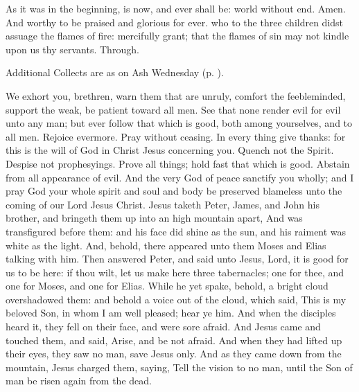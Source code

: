 As it was in the beginning, is now, and ever shall be: world without end. Amen. And worthy to be praised and glorious for ever.
{} who to the three children didst assuage the flames of fire: mercifully grant; that the flames of sin may not kindle upon us thy servants. Through.
\begin{rubric}
    Additional Collects are as on Ash Wednesday (p. \pageref{AshWednesdayMass}).
\end{rubric}
 We exhort you, brethren, warn them that are unruly, comfort the feebleminded, support the weak, be patient toward all men. See that none render evil for evil unto any man; but ever follow that which is good, both among yourselves, and to all men. Rejoice evermore. Pray without ceasing. In every thing give thanks: for this is the will of God in Christ Jesus concerning you. Quench not the Spirit. Despise not prophesyings. Prove all things; hold fast that which is good. Abstain from all appearance of evil. And the very God of peace sanctify you wholly; and I pray God your whole spirit and soul and body be preserved blameless unto the coming of our Lord Jesus Christ.
 Jesus taketh Peter, James, and John his brother, and bringeth them up into an high mountain apart, And was transfigured before them: and his face did shine as the sun, and his raiment was white as the light. And, behold, there appeared unto them Moses and Elias talking with him. Then answered Peter, and said unto Jesus, Lord, it is good for us to be here: if thou wilt, let us make here three tabernacles; one for thee, and one for Moses, and one for Elias. While he yet spake, behold, a bright cloud overshadowed them: and behold a voice out of the cloud, which said, This is my beloved Son, in whom I am well pleased; hear ye him. And when the disciples heard it, they fell on their face, and were sore afraid. And Jesus came and touched them, and said, Arise, and be not afraid. And when they had lifted up their eyes, they saw no man, save Jesus only. And as they came down from the mountain, Jesus charged them, saying, Tell the vision to no man, until the Son of man be risen again from the dead.
